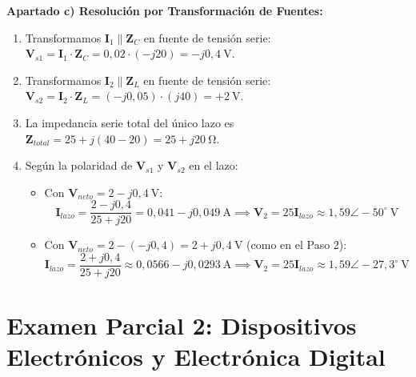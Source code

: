 \begin{ejercicio}
\vspace{4pt}
\textbf{Apartado c) Resolución por Transformación de Fuentes:}
\begin{enumerate}[label=\arabic*)]
    \item Transformamos $\mathbf{I}_1 \parallel \mathbf{Z}_C$ en fuente de tensión serie: $\mathbf{V}_{s1} = \mathbf{I}_1 \cdot \mathbf{Z}_C = 0{,}02 \cdot (-j20) = -j0{,}4\ \si{\volt}$.
    \item Transformamos $\mathbf{I}_2 \parallel \mathbf{Z}_L$ en fuente de tensión serie: $\mathbf{V}_{s2} = \mathbf{I}_2 \cdot \mathbf{Z}_L = (-j0{,}05) \cdot (j40) = +2\ \si{\volt}$.
    \item La impedancia serie total del único lazo es $\mathbf{Z}_{total} = 25 + j(40 - 20) = 25 + j20\ \si{\ohm}$.
    \item Según la polaridad de $\mathbf{V}_{s1}$ y $\mathbf{V}_{s2}$ en el lazo:
    \begin{itemize}
        \item Con $\mathbf{V}_{neto} = 2 - j0{,}4\ \si{\volt}$:
        \begin{equation}
            \mathbf{I}_{lazo} = \frac{2 - j0{,}4}{25 + j20} = 0{,}041 - j0{,}049\ \si{\ampere} \implies \mathbf{V}_2 = 25 \mathbf{I}_{lazo} \approx 1{,}59\angle -50^\circ\ \si{\volt}
        \end{equation}
        \item Con $\mathbf{V}_{neto} = 2 - (-j0{,}4) = 2 + j0{,}4\ \si{\volt}$ (como en el Paso 2):
        \begin{equation}
            \mathbf{I}_{lazo} = \frac{2 + j0{,}4}{25 + j20} \approx 0{,}0566 - j0{,}0293\ \si{\ampere} \implies \mathbf{V}_2 = 25 \mathbf{I}_{lazo} \approx 1{,}59\angle -27{,}3^\circ\ \si{\volt}
        \end{equation}
    \end{itemize}
\end{enumerate}
\end{ejercicio}

\section{Examen Parcial 2: Dispositivos Electrónicos y Electrónica Digital}

